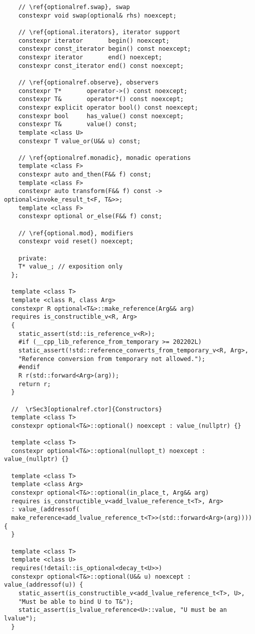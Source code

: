 \documentclass[a4paper,10pt,oneside,openany,final,article]{memoir}
\begin{document}
\begin{verbatim}
    // \ref{optionalref.swap}, swap
    constexpr void swap(optional& rhs) noexcept;

    // \ref{optional.iterators}, iterator support
    constexpr iterator       begin() noexcept;
    constexpr const_iterator begin() const noexcept;
    constexpr iterator       end() noexcept;
    constexpr const_iterator end() const noexcept;

    // \ref{optionalref.observe}, observers
    constexpr T*       operator->() const noexcept;
    constexpr T&       operator*() const noexcept;
    constexpr explicit operator bool() const noexcept;
    constexpr bool     has_value() const noexcept;
    constexpr T&       value() const;
    template <class U>
    constexpr T value_or(U&& u) const;

    // \ref{optionalref.monadic}, monadic operations
    template <class F>
    constexpr auto and_then(F&& f) const;
    template <class F>
    constexpr auto transform(F&& f) const -> optional<invoke_result_t<F, T&>>;
    template <class F>
    constexpr optional or_else(F&& f) const;

    // \ref{optional.mod}, modifiers
    constexpr void reset() noexcept;

    private:
    T* value_; // exposition only
  };

  template <class T>
  template <class R, class Arg>
  constexpr R optional<T&>::make_reference(Arg&& arg)
  requires is_constructible_v<R, Arg>
  {
    static_assert(std::is_reference_v<R>);
    #if (__cpp_lib_reference_from_temporary >= 202202L)
    static_assert(!std::reference_converts_from_temporary_v<R, Arg>,
    "Reference conversion from temporary not allowed.");
    #endif
    R r(std::forward<Arg>(arg));
    return r;
  }

  //  \rSec3[optionalref.ctor]{Constructors}
  template <class T>
  constexpr optional<T&>::optional() noexcept : value_(nullptr) {}

  template <class T>
  constexpr optional<T&>::optional(nullopt_t) noexcept : value_(nullptr) {}

  template <class T>
  template <class Arg>
  constexpr optional<T&>::optional(in_place_t, Arg&& arg)
  requires is_constructible_v<add_lvalue_reference_t<T>, Arg>
  : value_(addressof(
  make_reference<add_lvalue_reference_t<T>>(std::forward<Arg>(arg)))) {
  }

  template <class T>
  template <class U>
  requires(!detail::is_optional<decay_t<U>>)
  constexpr optional<T&>::optional(U&& u) noexcept : value_(addressof(u)) {
    static_assert(is_constructible_v<add_lvalue_reference_t<T>, U>,
    "Must be able to bind U to T&");
    static_assert(is_lvalue_reference<U>::value, "U must be an lvalue");
  }


\end{verbatim}
\end{document}
